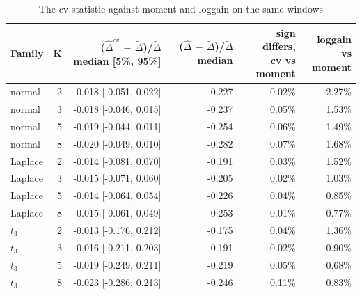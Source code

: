 \begin{table}[htbp]
\centering
\caption{The cv statistic against moment and loggain on the same windows}
\label{tab:a7b_cv_statistic}
\small
\begin{tabular}{lrrrrr}
\toprule
Family & K & \makecell[b]{($\hat\Delta^{cv}$ $-$ $\tilde\Delta$)/$\tilde\Delta$\\{}median [5\%, 95\%]} & \makecell[b]{($\hat\Delta$ $-$ $\tilde\Delta$)/$\tilde\Delta$\\{}median} & \makecell[b]{sign differs,\\{}cv vs moment} & \makecell[b]{loggain\\{}vs moment} \\
\midrule
normal & 2 & -0.018 [-0.051, 0.022] & -0.227 & 0.02\% & 2.27\% \\
normal & 3 & -0.018 [-0.046, 0.015] & -0.237 & 0.05\% & 1.53\% \\
normal & 5 & -0.019 [-0.044, 0.011] & -0.254 & 0.06\% & 1.49\% \\
normal & 8 & -0.020 [-0.049, 0.010] & -0.282 & 0.07\% & 1.68\% \\
Laplace & 2 & -0.014 [-0.081, 0.070] & -0.191 & 0.03\% & 1.52\% \\
Laplace & 3 & -0.015 [-0.071, 0.060] & -0.205 & 0.02\% & 1.03\% \\
Laplace & 5 & -0.014 [-0.064, 0.054] & -0.226 & 0.04\% & 0.85\% \\
Laplace & 8 & -0.015 [-0.061, 0.049] & -0.253 & 0.01\% & 0.77\% \\
$t_3$ & 2 & -0.013 [-0.176, 0.212] & -0.175 & 0.04\% & 1.36\% \\
$t_3$ & 3 & -0.016 [-0.211, 0.203] & -0.191 & 0.02\% & 0.90\% \\
$t_3$ & 5 & -0.019 [-0.249, 0.211] & -0.219 & 0.05\% & 0.68\% \\
$t_3$ & 8 & -0.023 [-0.286, 0.213] & -0.246 & 0.11\% & 0.83\% \\
\bottomrule
\end{tabular}
\end{table}
